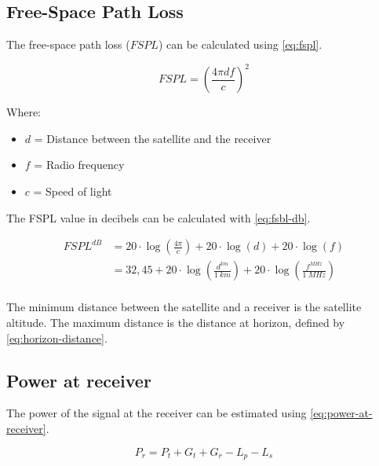 \subsection{Free-Space Path Loss}

The free-space path loss ($FSPL$) can be calculated using \autoref{eq:fspl}.

\begin{equation} \label{eq:fspl}
FSPL = \left( \frac{4\pi d f}{c} \right)^{2}
\end{equation}

Where:

\begin{itemize}
    \item $d$ = Distance between the satellite and the receiver
    \item $f$ = Radio frequency
    \item $c$ = Speed of light
\end{itemize}

The FSPL value in decibels can be calculated with \autoref{eq:fsbl-db}.

\begin{equation} \label{eq:fsbl-db}
    \begin{split}
        FSPL^{dB} & = 20 \cdot \log\left(\frac{4\pi}{c}\right) + 20 \cdot \log\left(d\right) + 20 \cdot \log\left(f\right) \\
                  & = 32,45 + 20 \cdot \log\left(\frac{d^{km}}{1\ km}\right) + 20 \cdot \log\left(\frac{f^{MHz}}{1\ MHz}\right) \\
    \end{split}
\end{equation}

The minimum distance between the satellite and a receiver is the satellite altitude. The maximum distance is the distance at horizon, defined by \autoref{eq:horizon-distance}.

\subsection{Power at receiver}

The power of the signal at the receiver can be estimated using \autoref{eq:power-at-receiver}.

\begin{equation} \label{eq:power-at-receiver}
    P_{r} = P_{t} + G_{t} + G_{r} - L_{p} - L_{s}
\end{equation}

